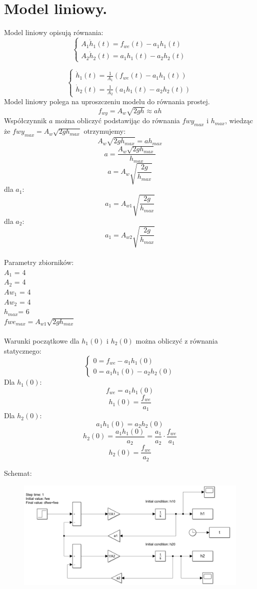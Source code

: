 \documentclass{article}
\begin{document}
\section{Model liniowy.}
Model liniowy opisują równania:
$$ 
 \begin{cases}
    A_1\dot h_{1}(t)=f_{we}(t)-a_{1}h_1(t)\\
    A_2\dot h_{2}(t)=a_{1}h_1(t)-a_{2}h_2(t)
  \end{cases}
$$

$$ 
  \begin{cases}
    \dot h_{1}(t)=\frac{1}{A_1} \left(f_{we}(t)-a_{1}h_1(t)\right)\\
    \dot h_{2}(t)= \frac{1}{A_{2}} \left( a_{1}h_1(t)-a_{2}h_2(t)\right)
  \end{cases}
 $$
 Model liniowy polega na uproszczeniu modelu do równania prostej.
 $$
f_{wy}=A_{w}\sqrt{2gh}\approx ah
 $$
 Współczynnik $a$ można obliczyć podstawijąc do równania $fwy_{max}$ i $h_{max}$, wiedząc że $fwy_{max}=A_{w}\sqrt{2gh_{max}}$  otrzymujemy:
 $$
 A_{w}\sqrt{2gh_{max}}=ah_{max}
 $$
 $$
 a=\frac{A_{w}\sqrt{2gh_{max}}}{h_{max}}
 $$
 $$
 a=A_{w}\sqrt{\frac{2g}{h_{max}}}
 $$
 dla $a_1$:
 $$
 a_1=A_{w1}\sqrt{\frac{2g}{h_{max}}}
 $$
 dla $a_2$:
 $$
  a_1=A_{w2}\sqrt{\frac{2g}{h_{max}}}
 $$
 \\
 Parametry zbiorników:\\             
$A_1$ = 4 \\
$A_2$ = 4  \\
$Aw_1$ = 4  \\
$Aw_2$ = 4\\
$h_{max}$= 6 \\
$fwe_{max}=A_{w1}\sqrt{2gh_{max}}$\\\\
Warunki początkowe dla $h_1(0)$ i $h_2(0)$ można obliczyć z równania statycznego:
$$
    \begin{cases}
    0=f_{we}-a_{1}h_1(0)\\
    0=a_{1}h_1(0)-a_{2}h_2(0)
  \end{cases}
 $$
 Dla $h_1(0):$
 $$
 f_{we}=a_1h_1(0)
 $$
 $$
 h_1(0)=\frac{f_{we}}{a_1}
 $$
 Dla $h_2(0):$
 $$
 a_{1}h_1(0)=a_{2}h_2(0)
 $$
 $$
 h_2(0)=\frac{a_{1}h_1(0)}{a_{2}}=\frac{a_1}{a_2}\cdot\frac{f_{we}}{a_1}
 $$
 $$
 h_2(0)=\frac{f_{we}}{a_2}
 $$
 
 \begin{flushleft}
 Schemat:\\
 \end{flushleft}
 \begin{figure}[h!]
    \centering
    \includegraphics[width=1\textwidth]{schematL.png}
    \label{fig:my_label}
\end{figure}
\end{document}
